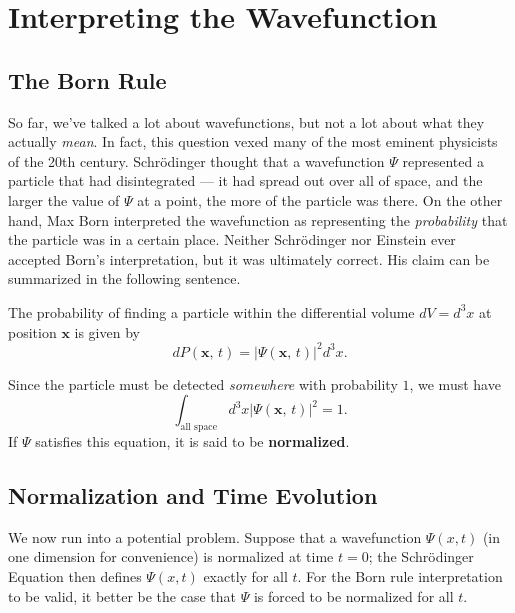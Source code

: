 \section{Interpreting the Wavefunction}
\subsection{The Born Rule}\label{born_rule}

So far, we've talked a lot about wavefunctions, but not a lot about what they actually \textit{mean}. In fact, this question vexed many of the most eminent physicists of the 20th century. Schrödinger thought that a wavefunction $\Psi$ represented a particle that had disintegrated --- it had spread out over all of space, and the larger the value of $\Psi$ at a point, the more of the particle was there. On the other hand, Max Born interpreted the wavefunction as representing the \textit{probability} that the particle was in a certain place. Neither Schrödinger nor Einstein ever accepted Born's interpretation, but it was ultimately correct. His claim can be summarized in the following sentence.

\begin{framedthm}
    The probability of finding a particle within the differential volume $dV=d^3x$ at position $\mathbf{x}$ is given by $$dP(\mathbf{x},\,t)=|\Psi(\mathbf{x},\,t)|^2d^3x.$$
\end{framedthm}

Since the particle must be detected \textit{somewhere} with probability $1$, we must have $$\int_{\text{all space}} d^3x|\Psi(\mathbf{x},\,t)|^2=1.$$If $\Psi$ satisfies this equation, it is said to be \textbf{normalized}. 

\subsection{Normalization and Time Evolution}\label{normalization}

We now run into a potential problem. Suppose that a wavefunction $\Psi(x,t)$ (in one dimension for convenience) is normalized at time $t=0$; the Schrödinger Equation then defines $\Psi(x,t)$ exactly for all $t$. For the Born rule interpretation to be valid, it better be the case that $\Psi$ is forced to be normalized for all $t$. 

